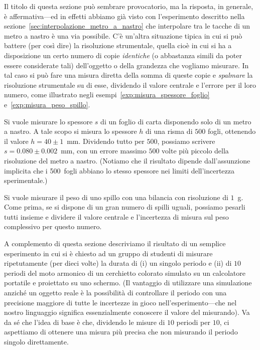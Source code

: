 Il titolo di questa sezione può sembrare provocatorio, ma la risposta,
in generale, è affermativa---ed in effetti abbiamo già visto con
l'esperimento descritto nella sezione~\ref{sec:interpolazione_metro_a_nastro}
che interpolare tra le tacche di un metro a nastro è una via possibile.
C'è un'altra situazione tipica in cui si può battere (per così dire) la
risoluzione strumentale, quella cioè in cui si ha a disposizione un certo
numero di copie \emph{identiche} (o abbastanza simili da poter essere
considerate tali) dell'oggetto o della grandezza che vogliamo misurare.
In tal caso si può fare una misura diretta della somma di queste copie
e \emph{spalmare} la risoluzione strumentale su di esse, dividendo il
valore centrale e l'errore per il loro numero, come illustrato negli
esempi~\ref{exp:misura_spessore_foglio} e~\ref{exp:misura_peso_spillo}.

\begin{examplebox}
  \begin{example}\label{exp:misura_spessore_foglio}
    Si vuole misurare lo spessore $s$ di un foglio di carta disponendo solo di
    un metro a nastro. A tale scopo si misura lo spessore $h$ di una risma di
    $500$ fogli, ottenendo il valore $h = 40 \pm 1$~mm. Dividendo tutto per
    $500$, possiamo scrivere $s = 0.080 \pm 0.002$~mm, con un errore massimo
    $500$ volte più piccolo della risoluzione del metro a nastro.
    (Notiamo che il risultato dipende dall'assunzione implicita che i 500~fogli
    abbiano lo stesso spessore nei limiti dell'incertezza sperimentale.)
  \end{example}

  \begin{example}\label{exp:misura_peso_spillo}
    Si vuole misurare il peso di uno spillo con una bilancia con risoluzione
    di $1$~g. Come prima, se si dispone di un gran numero di spilli uguali,
    possiamo pesarli tutti insieme e dividere il valore centrale e l'incertezza
    di misura sul peso complessivo per questo numero.
  \end{example}
\end{examplebox}

A complemento di questa sezione descriviamo il risultato di un semplice
esperimento in cui si è chiesto ad un gruppo di studenti di misurare
ripetutamente (per dieci volte) la durata di (i) un singolo periodo e (ii)
di $10$ periodi del moto armonico di un cerchietto colorato simulato su un
calcolatore portatile e proiettato su uno schermo. (Il vantaggio di utilizzare
una simulazione anziché un oggetto reale è la possibilità di controllare
il periodo con una precisione maggiore di tutte le incertezze in gioco
nell'esperimento---che nel nostro linguaggio significa essenzialmente conoscere
il valore del misurando). Va da sé che l'idea di base è che, dividendo
le misure di $10$ periodi per $10$, ci aspettiamo di ottenere una misura più
precisa che non misurando il periodo singolo direttamente.

